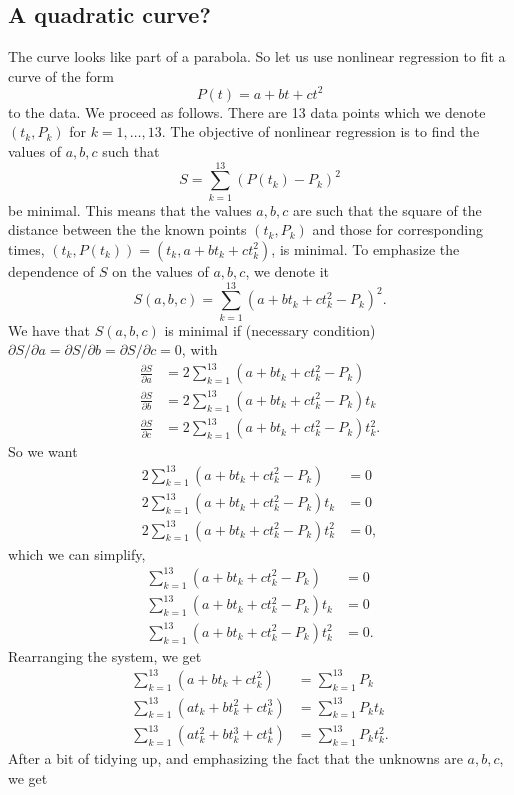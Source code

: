 \subsection{A quadratic curve?}
The curve looks like part of a parabola. So let us use nonlinear regression to fit a curve of the form
\[
P(t)=a+bt+ct^2
\]
to the data.
We proceed as follows.
There are 13 data points which we denote $(t_k,P_k)$ for $k=1,\ldots,13$. The objective of nonlinear regression is to find the values of $a,b,c$ such that
\[
S=\sum_{k=1}^{13} \left(P(t_k)-P_k\right)^2
\]
be minimal. This means that the values $a,b,c$ are such that the square of the distance between the the known points $(t_k,P_k)$ and those for corresponding times, $(t_k,P(t_k))=(t_k,a+bt_k+ct_k^2)$, is minimal. To emphasize the dependence of $S$ on the values of $a,b,c$, we denote it
\[
S(a,b,c)=\sum_{k=1}^{13} \left(a+bt_k+ct_k^2-P_k\right)^2.
\]
We have that $S(a,b,c)$ is minimal if (necessary condition) $\partial S/\partial a=\partial S/\partial b=\partial S/\partial c=0$, with
\begin{align*}
\frac{\partial S}{\partial a} &= 2\sum_{k=1}^{13}(a+bt_k+ct_k^2-P_k) \\
\frac{\partial S}{\partial b} &= 2\sum_{k=1}^{13}(a+bt_k+ct_k^2-P_k)t_k \\
\frac{\partial S}{\partial c} &= 2\sum_{k=1}^{13}(a+bt_k+ct_k^2-P_k)t_k^2.
\end{align*}
So we want
\begin{align*}
2\sum_{k=1}^{13}(a+bt_k+ct_k^2-P_k) &= 0\\
2\sum_{k=1}^{13}(a+bt_k+ct_k^2-P_k)t_k &= 0 \\
2\sum_{k=1}^{13}(a+bt_k+ct_k^2-P_k)t_k^2 &= 0,
\end{align*}
which we can simplify,
\begin{align*}
\sum_{k=1}^{13}(a+bt_k+ct_k^2-P_k) &= 0\\
\sum_{k=1}^{13}(a+bt_k+ct_k^2-P_k)t_k &= 0 \\
\sum_{k=1}^{13}(a+bt_k+ct_k^2-P_k)t_k^2 &= 0.
\end{align*}
Rearranging the system, we get
\begin{align*}
\sum_{k=1}^{13}(a+bt_k+ct_k^2) &= \sum_{k=1}^{13}P_k\\
\sum_{k=1}^{13}(at_k+bt_k^2+ct_k^3) &= \sum_{k=1}^{13}P_kt_k\\
\sum_{k=1}^{13}(at_k^2+bt_k^3+ct_k^4) &= \sum_{k=1}^{13}P_kt_k^2.
\end{align*}
After a bit of tidying up, and emphasizing the fact that the unknowns are $a,b,c$, we get

